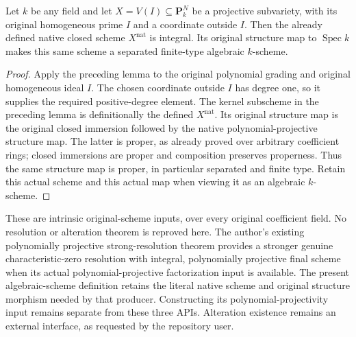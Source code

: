 \begin{lemma}\label{lem:original-native-subvariety-integral}
\leanok
Let $k$ be any field and let $X=V(I)\subseteq\mathbf P^N_k$ be a projective
subvariety, with its original homogeneous prime $I$ and a coordinate outside
$I$. Then the already defined native closed scheme $X^{\mathrm{nat}}$ is
integral. Its original structure map to $\operatorname{Spec}k$ makes this
same scheme a separated finite-type algebraic $k$-scheme.
\end{lemma}
\begin{proof}
Apply the preceding lemma to the original polynomial grading and original
homogeneous ideal $I$. The chosen coordinate outside $I$ has degree one,
so it supplies the required positive-degree element. The kernel subscheme
in the preceding lemma is definitionally the defined
$X^{\mathrm{nat}}$. Its original structure map is the original closed
immersion followed by the native polynomial-projective structure map.
The latter is proper, as already proved over arbitrary coefficient rings;
closed immersions are proper and composition preserves properness. Thus the
same structure map is proper, in particular separated and finite type.
Retain this actual scheme and this actual map when viewing it as an algebraic
$k$-scheme.
\end{proof}

\begin{remark}\label{rmk:original-native-integral-scheme-reuse}
These are intrinsic original-scheme inputs, over every original coefficient
field. No resolution or alteration theorem is reproved here. The author's existing polynomially projective strong-resolution theorem
provides a stronger genuine characteristic-zero resolution with integral,
polynomially projective final scheme when its actual polynomial-projective
factorization input is available. The present algebraic-scheme definition
retains the literal native scheme and original structure morphism needed
by that producer. Constructing its polynomial-projectivity input remains
separate from these three APIs. Alteration existence remains an external
interface, as requested by the repository user.
\end{remark}
